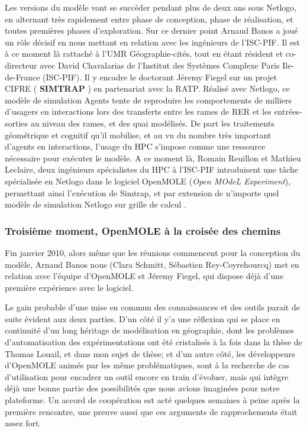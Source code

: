 Les versions du modèle vont se succèder pendant plus de deux ans sous Netlogo, en alternant très rapidement entre phase de conception, phase de réalisation, et toutes premières phases d'exploration. Sur ce dernier point Arnaud Banos a joué un rôle décisif en nous mettant en relation avec les ingénieurs de l'ISC-PIF. Il est à ce moment là rattaché à l'UMR Géographie-cités, tout en étant résident et co-directeur avec David Chavalarias de l'Institut des Systèmes Complexe Paris Ile-de-France (ISC-PIF). Il y encadre le doctorant Jéremy Fiegel sur un projet CIFRE ( \textbf{SIMTRAP} ) en partenariat avec la RATP. Réalisé avec Netlogo, ce modèle de simulation Agents tente de reproduire les comportements de milliers d'usagers en interactions lors des transferts entre les rames de RER et les entrées-sorties au niveau des rames, et des quai modélisés. De part les traitements géométrique et cognitif qu'il mobilise, et au vu du nombre très important d'agents en interactions, l'usage du HPC s'impose comme une ressource nécessaire pour exécuter le modèle. A ce moment là, Romain Reuillon et Mathieu Leclaire, deux ingénieurs spécialistes du HPC à l'ISC-PIF introduisent une tâche spécialisée en Netlogo dans le logiciel OpenMOLE (\textit{Open MOdeL Experiment}), permettant ainsi l'exécution de Simtrap, et par extension de n'importe quel modèle de simulation Netlogo sur grille de calcul \autocite[53]{Banos2013}.

\subsubsection{Troisième moment, OpenMOLE à la croisée des chemins}
\label{sssec:troisieme_moment}

Fin janvier 2010, alors même que les réunions commencent pour la conception du modèle, Arnaud Banos nous (Clara Schmitt, Sébastien Rey-Coyrehourcq) met en relation avec l'équipe d'OpenMOLE et Jéremy Fiegel, qui dispose déjà d'une première expérience avec le logiciel.

Le gain probable d'une mise en commun des connaissances et des outils parait de suite évident aux deux parties. D'un côté il y'a une réflexion qui se place en continuité d'un long héritage de modélisation en géographie, dont les problèmes d'automatisation des expérimentations ont été cristalisés à la fois dans la thèse de Thomas Louail, et dans mon sujet de thèse; et d'un autre côté, les développeurs d'OpenMOLE animés par les même problématiques, sont à la recherche de cas d'utilisation pour encadrer un outil encore en train d'évoluer, mais qui intègre déjà une bonne partie des possibilités que nous avions imaginées pour notre plateforme. Un accord de coopération est acté quelques semaines à peine après la première rencontre, une preuve aussi que ces arguments de rapprochements était assez fort.

